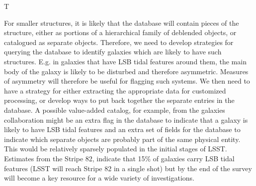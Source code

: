 \begin{tasklist}{T}
\begin{task}
{For smaller structures, it is likely that the database will contain pieces of the structure, either as portions  of a hierarchical  family of deblended objects, or catalogued  as separate objects.  Therefore, we need to develop strategies for querying the database to identify galaxies which are likely to have such structures. E.g. in galaxies that have LSB tidal features around them, the main body of the galaxy is likely to be disturbed and therefore asymmetric. Measures of asymmetry will therefore be useful for flagging such systems. We then need to have a strategy for either extracting the appropriate data for customized  processing, or develop ways to put back together  the separate  entries  in the database. A possible value-added catalog, for example, from the galaxies collaboration might be an extra flag in the database to indicate that a galaxy is likely to have LSB tidal features and an extra  set of fields for the database to indicate  which separate objects are probably part of the same physical entity.
\\
This would be relatively sparsely  populated in the  initial stages of LSST. Estimates from the Stripe 82, indicate that 15\% of galaxies carry LSB tidal features (LSST will reach Stripe 82 in a single shot) but by the end of the survey will become a key resource for a wide variety of investigations.
}
\end{task}
\end{tasklist}


